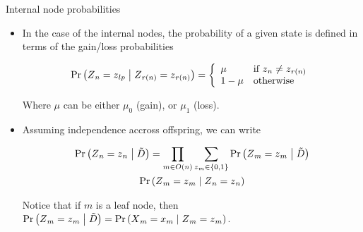 \documentclass[9pt,ignorenonframetext,]{beamer}
\newcommand{\Prcond}[2]{{\mbox{Pr}\left(#1\vphantom{#2}\;\right|\left.\vphantom{#1}#2\right)}}
\newcommand{\aphylo}{D{}}      %
\newcommand{\aphyloObs}{\tilde \aphylo{}} %
\newcommand{\Ann}{Z{}} %
\newcommand{\ann}{z{}} %
\newcommand{\AnnObs}{X{}}
\newcommand{\annObs}{x{}}
\begin{document}
\begin{frame}[t]{Internal node probabilities}

\begin{itemize}
\item
  In the case of the internal nodes, the probability of a given state is
  defined in terms of the gain/loss probabilities \pause

  \[
  \Prcond{\Ann_{n} = \ann_{lp}}{\Ann_{r(n)} = \ann_{r(n)}} = \left\{
  \begin{array}{ll}
  \mu & \mbox{if }\ann_{n} \neq \ann_{r(n)} \\
  1 - \mu & \mbox{otherwise}
  \end{array}
  \right.
  \]

  Where \(\mu\) can be either \(\mu_0\) (gain), or \(\mu_1\) (loss).
  \pause
\item
  Assuming independence accross offspring, we can write \pause

  \begin{multline}
  \label{eq:interior1}
  \Prcond{\Ann_n = \ann_n}{\aphyloObs} = %
  \prod_{m \in O(n)} \sum_{\ann_m \in \{0,1\}} \Prcond{\Ann_m = \ann_m}{\aphyloObs} \\
  \Prcond{\Ann_{m} = \ann_{m}}{\Ann_{n} = \ann_{n}}
  \end{multline}

  \pause

  Notice that if \(m\) is a leaf node, then
  \(\Prcond{\Ann_m = \ann_m}{\aphyloObs} = \Prcond{\AnnObs_m = \annObs_m}{\Ann_m = \ann_m}\).
\end{itemize}

\end{frame}
\end{document}
